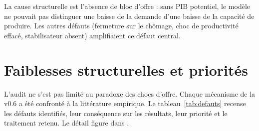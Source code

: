 \begin{resultat}
La cause structurelle est l'absence de bloc d'offre : sans PIB potentiel, le modèle ne pouvait pas distinguer une
baisse de la demande d'une baisse de la capacité de produire. Les autres défauts (fermeture sur le chômage, choc de
productivité effacé, stabilisateur absent) amplifiaient ce défaut central.
\end{resultat}

\chapter{Faiblesses structurelles et priorités}\label{ch:faiblesses}

L'audit ne s'est pas limité au paradoxe des chocs d'offre. Chaque mécanisme de la v0.6 a été confronté à la
littérature empirique. Le tableau~\ref{tab:defauts} recense les défauts identifiés, leur conséquence sur les
résultats, leur priorité et le traitement retenu. Le détail figure dans .

